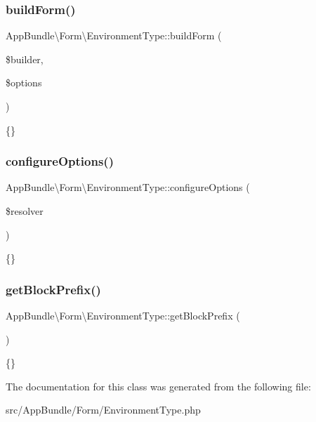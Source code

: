 \subsubsection{\texorpdfstring{build\+Form()}{buildForm()}}
{\footnotesize\ttfamily App\+Bundle\textbackslash{}\+Form\textbackslash{}\+Environment\+Type\+::build\+Form (\begin{DoxyParamCaption}\item[{Form\+Builder\+Interface}]{\$builder,  }\item[{array}]{\$options }\end{DoxyParamCaption})}

\{\} \mbox{\label{class_app_bundle_1_1_form_1_1_environment_type_a2c5f467c89b99ebdec89fef68deb0838}} 
\subsubsection{\texorpdfstring{configure\+Options()}{configureOptions()}}
{\footnotesize\ttfamily App\+Bundle\textbackslash{}\+Form\textbackslash{}\+Environment\+Type\+::configure\+Options (\begin{DoxyParamCaption}\item[{Options\+Resolver}]{\$resolver }\end{DoxyParamCaption})}

\{\} \mbox{\label{class_app_bundle_1_1_form_1_1_environment_type_a3b35f48ddd80f83d78a2f0cc5814d5fb}} 
\subsubsection{\texorpdfstring{get\+Block\+Prefix()}{getBlockPrefix()}}
{\footnotesize\ttfamily App\+Bundle\textbackslash{}\+Form\textbackslash{}\+Environment\+Type\+::get\+Block\+Prefix (\begin{DoxyParamCaption}{ }\end{DoxyParamCaption})}

\{\} 

The documentation for this class was generated from the following file\+:\begin{DoxyCompactItemize}
\item 
src/\+App\+Bundle/\+Form/Environment\+Type.\+php\end{DoxyCompactItemize}
